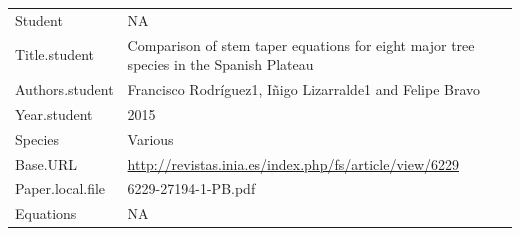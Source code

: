 \documentclass[]{article}
\begin{document}
\begin{longtable}[]{@{}ll@{}}
\toprule
\endhead
\begin{minipage}[t]{0.21\columnwidth}\raggedright
Student\strut
\end{minipage} & \begin{minipage}[t]{0.73\columnwidth}\raggedright
NA\strut
\end{minipage}\tabularnewline
\begin{minipage}[t]{0.21\columnwidth}\raggedright
Title.student\strut
\end{minipage} & \begin{minipage}[t]{0.73\columnwidth}\raggedright
Comparison of stem taper equations for eight major tree species in the
Spanish Plateau\strut
\end{minipage}\tabularnewline
\begin{minipage}[t]{0.21\columnwidth}\raggedright
Authors.student\strut
\end{minipage} & \begin{minipage}[t]{0.73\columnwidth}\raggedright
Francisco Rodríguez1, Iñigo Lizarralde1 and Felipe Bravo\strut
\end{minipage}\tabularnewline
\begin{minipage}[t]{0.21\columnwidth}\raggedright
Year.student\strut
\end{minipage} & \begin{minipage}[t]{0.73\columnwidth}\raggedright
2015\strut
\end{minipage}\tabularnewline
\begin{minipage}[t]{0.21\columnwidth}\raggedright
Species\strut
\end{minipage} & \begin{minipage}[t]{0.73\columnwidth}\raggedright
Various\strut
\end{minipage}\tabularnewline
\begin{minipage}[t]{0.21\columnwidth}\raggedright
Base.URL\strut
\end{minipage} & \begin{minipage}[t]{0.73\columnwidth}\raggedright
\url{http://revistas.inia.es/index.php/fs/article/view/6229}\strut
\end{minipage}\tabularnewline
\begin{minipage}[t]{0.21\columnwidth}\raggedright
Paper.local.file\strut
\end{minipage} & \begin{minipage}[t]{0.73\columnwidth}\raggedright
6229-27194-1-PB.pdf\strut
\end{minipage}\tabularnewline
\begin{minipage}[t]{0.21\columnwidth}\raggedright
Equations\strut
\end{minipage} & \begin{minipage}[t]{0.73\columnwidth}\raggedright
NA\strut
\end{minipage}\tabularnewline
\bottomrule
\end{longtable}
\end{document}
